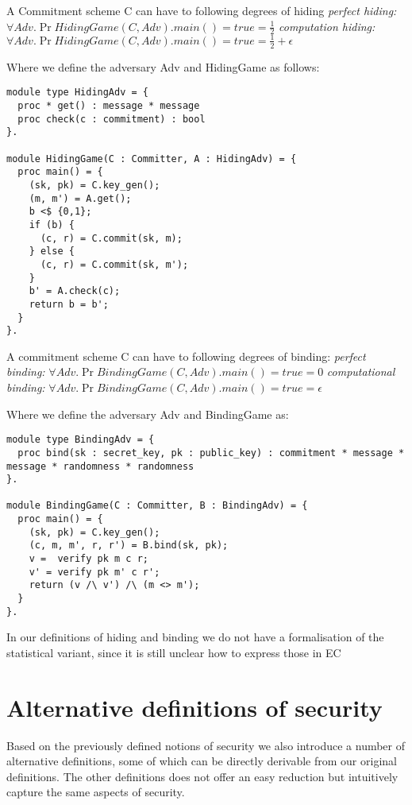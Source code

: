 \begin{definition}[Hiding]
  A Commitment scheme C can have to following degrees of hiding
  \label{def:commitment:hiding}
  \textit{perfect hiding:} $\forall Adv. \Pr{HidingGame(C,Adv).main() = true} = \frac{1}{2}$
  \textit{computation hiding:} $\forall Adv. \Pr{HidingGame(C,Adv).main() = true} = \frac{1}{2} + \epsilon$

  Where we define the adversary Adv and HidingGame as follows:
\begin{lstlisting}
module type HidingAdv = {
  proc * get() : message * message
  proc check(c : commitment) : bool
}.

module HidingGame(C : Committer, A : HidingAdv) = {
  proc main() = {
    (sk, pk) = C.key_gen();
    (m, m') = A.get();
    b <$ {0,1};
    if (b) {
      (c, r) = C.commit(sk, m);
    } else {
      (c, r) = C.commit(sk, m');
    }
    b' = A.check(c);
    return b = b';
  }
}.
\end{lstlisting}
\end{definition}

\begin{definition}[Binding]
  \label{def:commitment:binding}
  A commitment scheme C can have to following degrees of binding:
  \textit{perfect binding:} $\forall Adv. \Pr{BindingGame(C, Adv).main() = true} = 0$
  \textit{computational binding:} $\forall Adv. \Pr{BindingGame(C, Adv).main() = true} = \epsilon$

  Where we define the adversary Adv and BindingGame as:
\begin{lstlisting}
module type BindingAdv = {
  proc bind(sk : secret_key, pk : public_key) : commitment * message * message * randomness * randomness
}.

module BindingGame(C : Committer, B : BindingAdv) = {
  proc main() = {
    (sk, pk) = C.key_gen();
    (c, m, m', r, r') = B.bind(sk, pk);
    v =  verify pk m c r;
    v' = verify pk m' c r';
    return (v /\ v') /\ (m <> m');
  }
}.

\end{lstlisting}
\end{definition}

In our definitions of hiding and binding we do not have a formalisation of the statistical variant, since it is still unclear how to express those in EC 

\section{Alternative definitions of security}
\label{sec:commitment:alt-sec}
Based on the previously defined notions of security we also introduce a number
of alternative definitions, some of which can be directly derivable from our
original definitions. The other definitions does not offer an easy reduction but
intuitively capture the same aspects of security.

